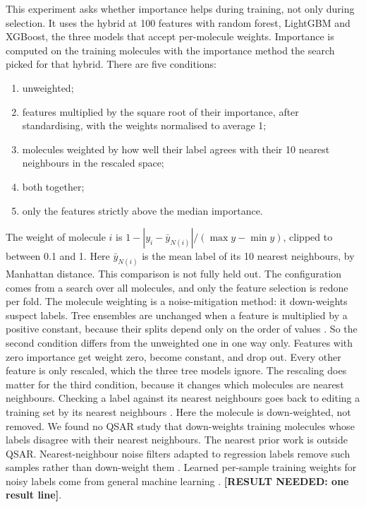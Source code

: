 This experiment asks whether importance helps during training, not only during selection. It uses the hybrid at 100 features with random forest, LightGBM and XGBoost, the three models that accept per-molecule weights. Importance is computed on the training molecules with the importance method the search picked for that hybrid. There are five conditions:
\begin{enumerate}[leftmargin=*]
    \item unweighted;
    \item features multiplied by the square root of their importance, after standardising, with the weights normalised to average 1;
    \item molecules weighted by how well their label agrees with their 10 nearest neighbours in the rescaled space;
    \item both together;
    \item only the features strictly above the median importance.
\end{enumerate}
The weight of molecule $i$ is $1 - |y_i - \bar y_{N(i)}| / (\max y - \min y)$, clipped to between 0.1 and 1. Here $\bar y_{N(i)}$ is the mean label of its 10 nearest neighbours, by Manhattan distance. This comparison is not fully held out. The configuration comes from a search over all molecules, and only the feature selection is redone per fold. The molecule weighting is a noise-mitigation method: it down-weights suspect labels. Tree ensembles are unchanged when a feature is multiplied by a positive constant, because their splits depend only on the order of values \citep{Hastie2009}. So the second condition differs from the unweighted one in one way only. Features with zero importance get weight zero, become constant, and drop out. Every other feature is only rescaled, which the three tree models ignore. The rescaling does matter for the third condition, because it changes which molecules are nearest neighbours. Checking a label against its nearest neighbours goes back to editing a training set by its nearest neighbours \citep{Wilson1972}. Here the molecule is down-weighted, not removed. We found no QSAR study that down-weights training molecules whose labels disagree with their nearest neighbours. The nearest prior work is outside QSAR. Nearest-neighbour noise filters adapted to regression labels remove such samples rather than down-weight them \citep{Martin2021}. Learned per-sample training weights for noisy labels come from general machine learning \citep{shu2019metaweightnet}. \textbf{[RESULT NEEDED: one result line]}.

